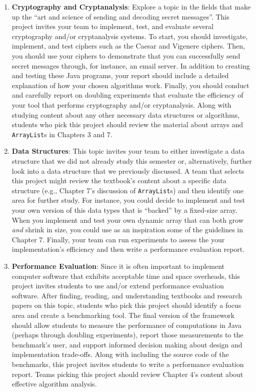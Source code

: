 \documentclass[11pt]{article}
\newcommand{\program}[1]{\lstinline{#1}}
\begin{document}
\begin{enumerate}

  \item {\bf Cryptography and Cryptanalysis}: Explore a topic in the fields that
    make up the ``art and science of sending and decoding secret messages''.
    This project invites your team to implement, test, and evaluate several
    cryptography and/or cryptanalysis systems. To start, you should investigate,
    implement, and test ciphers such as the Caesar and Vigenere ciphers. Then,
    you should use your ciphers to demonstrate that you can successfully send
    secret messages through, for instance, an email server. In addition to
    creating and testing these Java programs, your report should include a
    detailed explanation of how your chosen algorithms work. Finally, you should
    conduct and carefully report on doubling experiments that evaluate the
    efficiency of your tool that performs cryptography and/or cryptanalysis.
    Along with studying content about any other necessary data structures or
    algorithms, students who pick this project should review the material about
    arrays and \program{ArrayList}s in Chapters 3 and 7.

  \item {\bf Data Structures}: This topic invites your team to either
    investigate a data structure that we did not already study this semester or,
    alternatively, further look into a data structure that we previously
    discussed. A team that selects this project might review the textbook's
    content about a specific data structure (e.g., Chapter 7's discussion of
    \program{ArrayList}s) and then identify one area for further study. For
    instance, you could decide to implement and test your own version of this
    data types that is ``backed'' by a fixed-size array. When you implement and
    test your own dynamic array that can both grow {\em and} shrink in size, you
    could use as an inspiration some of the guidelines in Chapter 7. Finally,
    your team can run experiments to assess the your implementation's efficiency
    and then write a performance evaluation report.

  \item {\bf Performance Evaluation}: Since it is often important to implement
    computer software that exhibits acceptable time and space overheads, this
    project invites students to use and/or extend performance evaluation
    software. After finding, reading, and understanding textbooks and research
    papers on this topic, students who pick this project should identify a focus
    area and create a benchmarking tool. The final version of the framework
    should allow students to measure the performance of computations in Java
    (perhaps through doubling experiments), report those measurements to the
    benchmark's user, and support informed decision making about design and
    implementation trade-offs. Along with including the source code of the
    benchmarks, this project invites students to write a performance evaluation
    report. Teams picking this project should review Chapter 4's content about
    effective algorithm analysis.


\end{enumerate}
\end{document}
